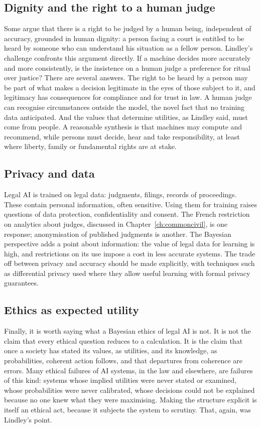 \subsection{Dignity and the right to a human judge}

Some argue that there is a right to be judged by a human being, independent of accuracy, grounded in human dignity: a person facing a court is entitled to be heard by someone who can understand his situation as a fellow person. Lindley's challenge confronts this argument directly. If a machine decides more accurately and more consistently, is the insistence on a human judge a preference for ritual over justice? There are several answers. The right to be heard by a person may be part of what makes a decision legitimate in the eyes of those subject to it, and legitimacy has consequences for compliance and for trust in law. A human judge can recognise circumstances outside the model, the novel fact that no training data anticipated. And the values that determine utilities, as Lindley said, must come from people. A reasonable synthesis is that machines may compute and recommend, while persons must decide, hear and take responsibility, at least where liberty, family or fundamental rights are at stake.

\subsection{Privacy and data}

Legal AI is trained on legal data: judgments, filings, records of proceedings. These contain personal information, often sensitive. Using them for training raises questions of data protection, confidentiality and consent. The French restriction on analytics about judges, discussed in Chapter~\ref{ch:commoncivil}, is one response; anonymisation of published judgments is another. The Bayesian perspective adds a point about information: the value of legal data for learning is high, and restrictions on its use impose a cost in less accurate systems. The trade off between privacy and accuracy should be made explicitly, with techniques such as differential privacy used where they allow useful learning with formal privacy guarantees.

\subsection{Ethics as expected utility}

Finally, it is worth saying what a Bayesian ethics of legal AI is not. It is not the claim that every ethical question reduces to a calculation. It is the claim that once a society has stated its values, as utilities, and its knowledge, as probabilities, coherent action follows, and that departures from coherence are errors. Many ethical failures of AI systems, in the law and elsewhere, are failures of this kind: systems whose implied utilities were never stated or examined, whose probabilities were never calibrated, whose decisions could not be explained because no one knew what they were maximising. Making the structure explicit is itself an ethical act, because it subjects the system to scrutiny. That, again, was Lindley's point.

